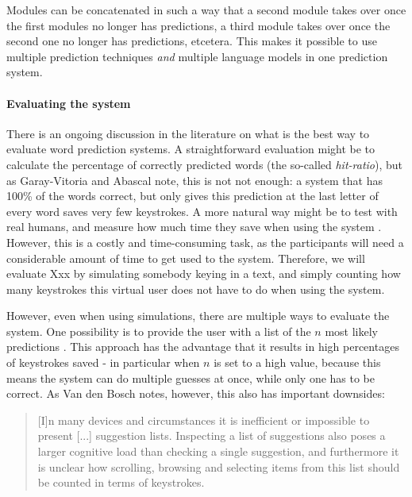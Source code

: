 \documentclass[11pt]{article}
\begin{document}
Modules can be concatenated in such a way that a second module takes over once the first modules no longer has predictions, a third module takes over once the second one no longer has predictions, etcetera. This makes it possible to use multiple prediction techniques \emph{and} multiple language models in one prediction system.

\paragraph{Evaluating the system} \label{evaluation}

There is an ongoing discussion in the literature on what is the best way to evaluate word prediction systems. A straightforward evaluation might be to calculate the percentage of correctly predicted words (the so-called \emph{hit-ratio}), but as Garay-Vitoria and Abascal  note, this is not not enough: a system that has 100\% of the words correct, but only gives this prediction at the last letter of every word saves very few keystrokes. A more natural way might be to test with real humans, and measure how much time they save when using the system \cite{carlberger+97,koester+98,Garay-Vitoria+06}. However, this is a costly and time-consuming task, as the participants will need a considerable amount of time to get used to the system. Therefore, we will evaluate Xxx by simulating somebody keying in a text, and simply counting how many keystrokes this virtual user does not have to do when using the system. 

However, even when using simulations, there are multiple ways to evaluate the system. One possibility is to provide the user with a list of the $n$ most likely predictions \cite{Lesher+99,Fazly+03}. This approach has the advantage that it results in high percentages of keystrokes saved - in particular when $n$ is set to a high value, because this means the system can do multiple guesses at once, while only one has to be correct. As Van den Bosch  notes, however, this also has important downsides: 

\begin{quotation}
[I]n many devices and circumstances it is inefficient or impossible to present [...] suggestion lists. Inspecting a list of suggestions also poses a larger cognitive load than checking a single suggestion, and furthermore it is unclear how scrolling, browsing and selecting items from this list should be counted in terms of keystrokes.
\end{quotation}
\end{document}
